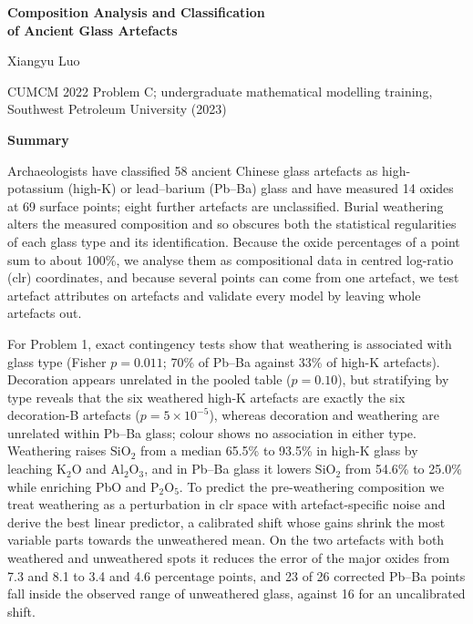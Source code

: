\documentclass[11pt,a4paper]{article}
\newcommand{\ox}[1]{\ensuremath{\mathrm{#1}}}
\begin{document}
\thispagestyle{empty}
\begin{center}
{\LARGE\bfseries Composition Analysis and Classification\\[3pt] of Ancient Glass Artefacts\par}
\vspace{6pt}
{\normalsize Xiangyu Luo\par}
{\small CUMCM 2022 Problem C; undergraduate mathematical modelling training, Southwest Petroleum University (2023)\par}
\vspace{10pt}
{\Large\bfseries Summary\par}
\end{center}

\noindent
Archaeologists have classified 58 ancient Chinese glass artefacts as high-potassium (high-K) or lead--barium (Pb--Ba) glass and have measured 14 oxides at 69 surface points; eight further artefacts are unclassified.
Burial weathering alters the measured composition and so obscures both the statistical regularities of each glass type and its identification.
Because the oxide percentages of a point sum to about 100\%, we analyse them as compositional data in centred log-ratio (clr) coordinates, and because several points can come from one artefact, we test artefact attributes on artefacts and validate every model by leaving whole artefacts out.

For Problem 1, exact contingency tests show that weathering is associated with glass type (Fisher $p=0.011$; 70\% of Pb--Ba against 33\% of high-K artefacts).
Decoration appears unrelated in the pooled table ($p=0.10$), but stratifying by type reveals that the six weathered high-K artefacts are exactly the six decoration-B artefacts ($p=5\times10^{-5}$), whereas decoration and weathering are unrelated within Pb--Ba glass; colour shows no association in either type.
Weathering raises \ox{SiO_2} from a median 65.5\% to 93.5\% in high-K glass by leaching \ox{K_2O} and \ox{Al_2O_3}, and in Pb--Ba glass it lowers \ox{SiO_2} from 54.6\% to 25.0\% while enriching PbO and \ox{P_2O_5}.
To predict the pre-weathering composition we treat weathering as a perturbation in clr space with artefact-specific noise and derive the best linear predictor, a calibrated shift whose gains shrink the most variable parts towards the unweathered mean.
On the two artefacts with both weathered and unweathered spots it reduces the error of the major oxides from 7.3 and 8.1 to 3.4 and 4.6 percentage points, and 23 of 26 corrected Pb--Ba points fall inside the observed range of unweathered glass, against 16 for an uncalibrated shift.
\end{document}

